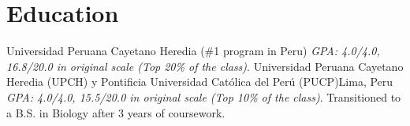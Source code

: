 \documentclass[11pt,a4paper,sans]{moderncv}
\begin{document}
\makecvtitle
\vspace{-1cm}

\section{Education}
{Universidad Peruana Cayetano Heredia (\#1 program in Peru)}{}{}
{\textit{GPA: 4.0/4.0, 16.8/20.0 in original scale (Top 20\% of the class)}.}  %
  {Universidad Peruana Cayetano Heredia (UPCH) y Pontificia Universidad Católica del Perú (PUCP)}{Lima, Peru}{}
  {\textit{GPA: 4.0/4.0, 15.5/20.0 in original scale (Top 10\% of the class)}. Transitioned to a B.S. in Biology after 3 years of coursework.}
\end{document}
